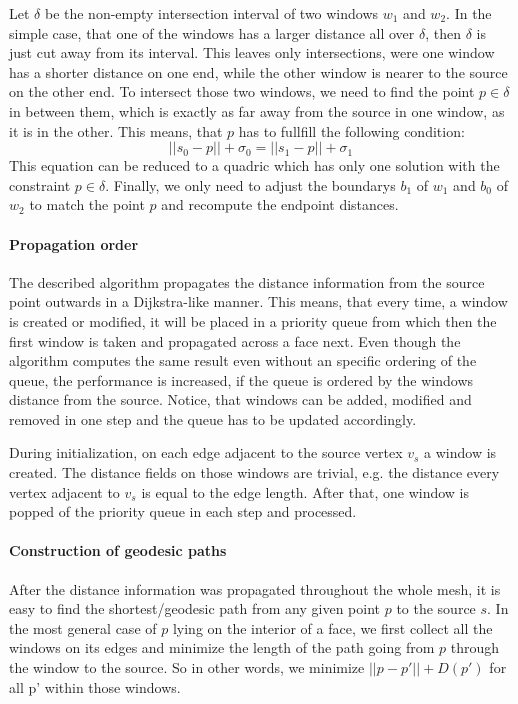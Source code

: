 Let $\delta$ be the non-empty intersection interval of two windows $w_1$ and $w_2$.
In the simple case, that one of the windows has a larger distance all over $\delta$, then $\delta$ is just cut away from its interval.
This leaves only intersections, were one window has a shorter distance on one end, while the other window is nearer to the source on the other end.
To intersect those two windows, we need to find the point $p \in \delta$  in between them, which is exactly as far away from the source in one window, as it is in the other.
This means, that $p$ has to fullfill the following condition:
$$||s_0 - p|| + \sigma_0 = ||s_1 - p|| + \sigma_1$$
This equation can be reduced to a quadric which has only one solution with the constraint $p \in \delta$.
Finally, we only need to adjust the boundarys $b_1$ of $w_1$ and $b_0$ of $w_2$ to match the point $p$ and recompute the endpoint distances.

\paragraph{Propagation order}
The described algorithm propagates the distance information from the source point outwards in a Dijkstra-like manner.
This means, that every time, a window is created or modified, it will be placed in a priority queue from which then the first window is taken and propagated across a face next.
Even though the algorithm computes the same result even without an specific ordering of the queue, the performance is increased, if the queue is ordered by the windows distance from the source.
Notice, that windows can be added, modified and removed in one step and the queue has to be updated accordingly.

During initialization, on each edge adjacent to the source vertex $v_s$ a window is created.
The distance fields on those windows are trivial, e.g. the distance every vertex adjacent to $v_s$ is equal to the edge length.
After that, one window is popped of the priority queue in each step and processed.

\paragraph{Construction of geodesic paths}
After the distance information was propagated throughout the whole mesh, it is easy to find the shortest/geodesic path from any given point $p$ to the source $s$.
In the most general case of $p$ lying on the interior of a face, we first collect all the windows on its edges and minimize the length of the path going from $p$ through the window to the source.
So in other words, we minimize $||p - p'|| + D(p')$ for all p' within those windows.

